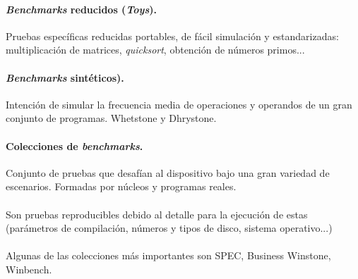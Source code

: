 \documentclass{article}
\begin{document}
\begin{multicols}{2}
		\paragraph{\textit{Benchmarks} reducidos (\textit{Toys}).}
		Pruebas específicas reducidas portables, de fácil simulación y estandarizadas: multiplicación de matrices, \textit{quicksort}, obtención de números primos...
		
		\paragraph{\textit{Benchmarks} sintéticos).}
		Intención de simular la frecuencia media de operaciones y operandos de un gran conjunto de programas. Whetstone y Dhrystone.
		
		\paragraph{Colecciones de \textit{benchmarks}.}
		 Conjunto de pruebas que desafían al dispositivo bajo una gran variedad de escenarios. Formadas por núcleos y programas reales. 
		 \paragraph{}
		 Son pruebas reproducibles debido al detalle para la ejecución de estas (parámetros de compilación, números y tipos de disco, sistema operativo...)
		 \paragraph{}
		 Algunas de las colecciones más importantes son SPEC, Business Winstone, Winbench. 
		
	\end{multicols}
	
\end{document}
